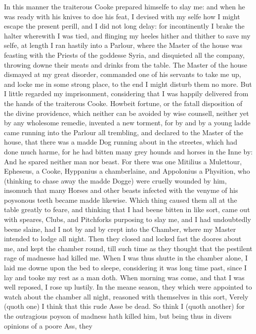 In this manner the traiterous Cooke prepared himselfe to slay me: and when he
was ready with his knives to doe his feat, I devised with my selfe how I might
escape the present perill, and I did not long delay: for incontinently I brake
the halter wherewith I was tied, and flinging my heeles hither and thither to
save my selfe, at length I ran hastily into a Parlour, where the Master of the
house was feasting with the Priests of the goddesse Syria, and disquieted all
the company, throwing downe their meats and drinks from the table. The Master
of the house dismayed at my great disorder, commanded one of his servants to
take me up, and locke me in some strong place, to the end I might disturb them
no more. But I little regarded my imprisonment, considering that I was happily
delivered from the hands of the traiterous Cooke. Howbeit fortune, or the
fatall disposition of the divine providence, which neither can be avoided by
wise counsell, neither yet by any wholesome remedie, invented a new torment,
for by and by a young ladde came running into the Parlour all trembling, and
declared to the Master of the house, that there was a madde Dog running about
in the streetes, which had done much harme, for he had bitten many grey hounds
and horses in the Inne by: And he spared neither man nor beast. For there was
one Mitilius a Mulettour, Epheseus, a Cooke, Hyppanius a chamberlaine, and
Appolonius a Physition, who (thinking to chase away the madde Dogge) were
cruelly wounded by him, insomuch that many Horses and other beasts infected
with the venyme of his poysonous teeth became madde likewise. Which thing
caused them all at the table greatly to feare, and thinking that I had beene
bitten in like sort, came out with speares, Clubs, and Pitchforks purposing to
slay me, and I had undoubtedly beene slaine, had I not by and by crept into the
Chamber, where my Master intended to lodge all night. Then they closed and
locked fast the doores about me, and kept the chamber round, till such time as
they thought that the pestilent rage of madnesse had killed me. When I was thus
shutte in the chamber alone, I laid me downe upon the bed to sleepe,
considering it was long time past, since I lay and tooke my rest as a man doth.
When morning was come, and that I was well reposed, I rose up lustily. In the
meane season, they which were appointed to watch about the chamber all night,
reasoned with themselves in this sort, Verely (quoth one) I think that this
rude Asse be dead. So think I (quoth another) for the outragious poyson of
madness hath killed him, but being thus in divers opinions of a poore Ass, they
